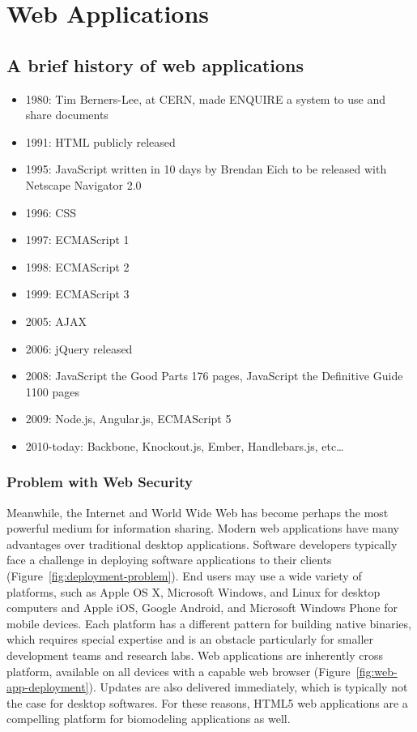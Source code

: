 \chapter{Web Applications}
\label{appendix-web}
\section{A brief history of web applications}
\label{appendix-web-history}

\autocite{w3c2014history}
\autocite{berners2014design}
\begin{itemize}
  \item 1980: Tim Berners-Lee, at CERN, made ENQUIRE a system to use and share documents
  \item 1991: HTML publicly released
  \item 1995: JavaScript written in 10 days by Brendan Eich to be released with Netscape Navigator 2.0
  \item 1996: CSS
  \item 1997: ECMAScript 1
  \item 1998: ECMAScript 2
  \item 1999: ECMAScript 3
  \item 2005: AJAX \autocite{garrett2005ajax}
  \item 2006: jQuery released
  \item 2008: JavaScript the Good Parts 176 pages, JavaScript the Definitive Guide 1100 pages
  \item 2009: Node.js, Angular.js, ECMAScript 5
  \item 2010-today: Backbone, Knockout.js, Ember, Handlebars.js, etc\ldots
\end{itemize}

\subsection{Problem with Web Security}

\autocite{grier2008secure}

Meanwhile, the Internet and World Wide Web \autocite{berners2000weaving} has become perhaps the most powerful medium for information sharing. \autocite{bollacker1998citeseer, wilkinson2003motivations, page1999pagerank}
Modern web applications have many advantages over traditional desktop applications.
Software developers typically face a challenge in deploying software applications to their clients (Figure~\ref{fig:deployment-problem}).
End users may use a wide variety of platforms, such as Apple OS X, Microsoft Windows, and Linux for desktop computers and Apple iOS, Google Android, and Microsoft Windows Phone for mobile devices.
Each platform has a different pattern for building native binaries, which requires special expertise and is an obstacle particularly for smaller development teams and research labs.
Web applications are inherently cross platform, available on all devices with a capable web browser (Figure~\ref{fig:web-app-deployment}).
Updates are also delivered immediately, which is typically not the case for desktop softwares.
For these reasons, HTML5 web applications are a compelling platform for biomodeling applications as well.

